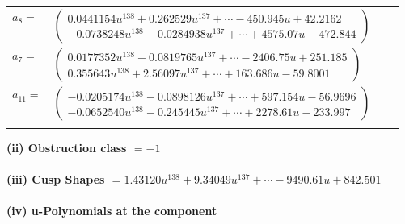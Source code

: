 \documentclass[1p]{elsarticle_modified}
\theoremstyle{definition}
\begin{document}
\begin{tabular}{m{7pt} m{180pt} m{7pt} m{180pt} }
\flushright $a_{8}=$&$\begin{pmatrix}0.0441154 u^{138}+0.262529 u^{137}+\cdots-450.945 u+42.2162\\-0.0738248 u^{138}-0.0284938 u^{137}+\cdots+4575.07 u-472.844\end{pmatrix}$ \\
\flushright $a_{7}=$&$\begin{pmatrix}0.0177352 u^{138}-0.0819765 u^{137}+\cdots-2406.75 u+251.185\\0.355643 u^{138}+2.56097 u^{137}+\cdots+163.686 u-59.8001\end{pmatrix}$ \\
\flushright $a_{11}=$&$\begin{pmatrix}-0.0205174 u^{138}-0.0898126 u^{137}+\cdots+597.154 u-56.9696\\-0.0652540 u^{138}-0.245445 u^{137}+\cdots+2278.61 u-233.997\end{pmatrix}$\\&\end{tabular}
\flushleft \textbf{(ii) Obstruction class $= -1$}\\~\\
\flushleft \textbf{(iii) Cusp Shapes $= 1.43120 u^{138}+9.34049 u^{137}+\cdots-9490.61 u+842.501$}\\~\\
\newpage\renewcommand{\arraystretch}{1}
\flushleft \textbf{(iv) u-Polynomials at the component}\newline \\
\end{document}
